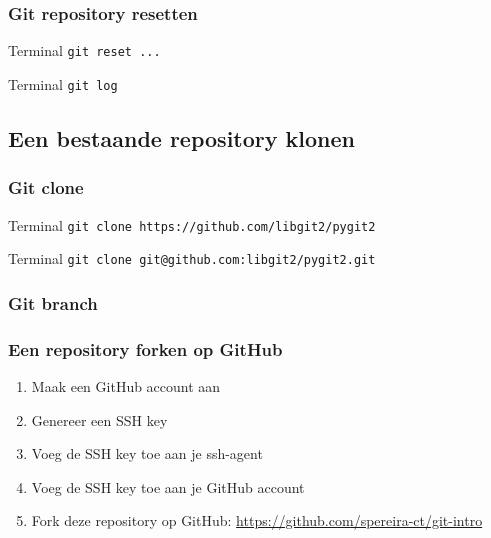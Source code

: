 \documentclass[]{beamer}
\begin{document}
\begin{frame}[fragile]
    \frametitle{Git repository resetten}

    \begin{block}{Terminal}
    \verb/git reset .../
    \end{block}

    \pause

    \begin{block}{Terminal}
    \verb/git log/
    \end{block}
\end{frame}

\subsection{Een bestaande repository klonen}

\begin{frame}[fragile]
    \frametitle{Git clone}

    \begin{block}{Terminal}
    \verb$git clone https://github.com/libgit2/pygit2$
    \end{block}

    \pause

    \begin{block}{Terminal}
    \verb$git clone git@github.com:libgit2/pygit2.git$
    \end{block}
\end{frame}

\begin{frame}[fragile]
    \frametitle{Git branch}

\end{frame}

\begin{frame}
    \frametitle{Een repository forken op GitHub}

    \begin{enumerate}
        \item Maak een GitHub account aan
        \item Genereer een SSH key
        \item Voeg de SSH key toe aan je ssh-agent
        \item Voeg de SSH key toe aan je GitHub account
        \item Fork deze repository op GitHub: \url{https://github.com/spereira-ct/git-intro}
    \end{enumerate}
\end{frame}
\end{document}
